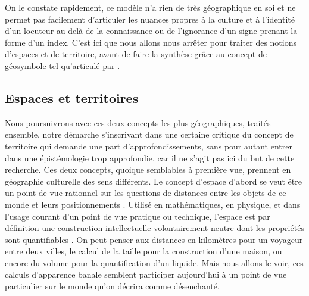 On le constate rapidement, ce modèle n'a  rien de très géographique en soi et ne permet pas facilement d'articuler les nuances propres à la culture et à l'identité d'un locuteur au-delà de la connaissance ou de l'ignorance d'un signe prenant la forme d'un index. 
C'est ici que nous allons nous arrêter pour traiter des notions d'espaces et de territoire, avant de faire la synthèse grâce au concept de géosymbole tel qu'articulé par \citet{Bonnemaison1981}.


\subsection{Espaces et territoires}
\label{sec:espaces_et_territoires} Nous poursuivrons avec ces deux concepts les plus géographiques, traités ensemble,  notre démarche s'inscrivant dans une certaine critique du concept de territoire qui demande une part d'approfondissements,  sans pour autant entrer dans une épistémologie trop approfondie, car il ne s'agit pas ici du but de cette recherche. 
Ces deux concepts, quoique semblables à première vue, prennent en géographie culturelle des sens différents. 
Le concept d'espace d'abord se veut être un point de vue rationnel sur les questions de distances entre les objets de ce monde et leurs positionnements . 
Utilisé en mathématiques, en physique, et dans l'usage courant d'un point de vue pratique ou technique, l'espace est par définition une construction intellectuelle volontairement neutre dont les propriétés sont quantifiables .
On peut penser aux distances en kilomètres pour un voyageur entre deux villes, le calcul de la taille pour la construction d'une maison, ou encore du volume pour la quantification d'un liquide. 
Mais nous allons le voir, ces calculs d'apparence banale semblent participer aujourd'hui à un point de vue particulier sur le monde qu'on décrira comme désenchanté.

